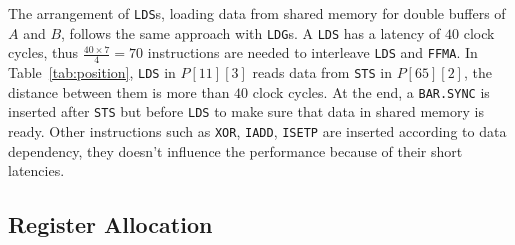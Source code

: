 The arrangement of {\tt LDS}s, loading data from shared memory for double buffers of $A$ and $B$, follows the same approach with {\tt LDG}s.
A {\tt LDS} has a latency of $40$ clock cycles, thus $\frac{40\times 7}{4}=70$ instructions are needed to interleave {\tt LDS} and {\tt FFMA}. 
In Table~\ref{tab:position}, {\tt LDS} in $P[11][3]$ reads data from {\tt STS} in $P[65][2]$, 
the distance between them is more than $40$ clock cycles. 
At the end, a {\tt BAR.SYNC} is inserted after {\tt STS} but before {\tt LDS} to make sure that data in shared memory is ready. 
Other instructions such as {\tt XOR}, {\tt IADD}, {\tt ISETP} are inserted according to data dependency, they doesn't influence the performance because of their short latencies.


\subsection{Register Allocation}

